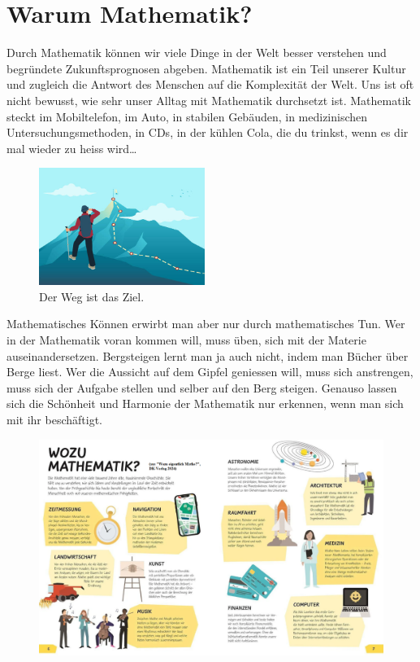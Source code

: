 \section{Warum Mathematik?}
Durch Mathematik können wir viele Dinge in der Welt besser verstehen und begründete Zukunftsprognosen abgeben. Mathematik ist ein Teil unserer Kultur und zugleich die Antwort des Menschen auf die Komplexität der Welt. Uns ist oft nicht bewusst, wie sehr unser Alltag mit Mathematik durchsetzt ist. Mathematik steckt im Mobiltelefon, im Auto, in stabilen Gebäuden, in medizinischen Untersuchungsmethoden, in CDs, in der kühlen Cola, die du trinkst, wenn es dir mal wieder zu heiss wird\ldots
\begin{figure}
	\begin{center}
		\includegraphics[width=0.48\textwidth]{Bergsteigen}
	\end{center}
	\caption{Der Weg ist das Ziel.}
\end{figure}
Mathematisches Können erwirbt man aber nur durch mathematisches Tun. Wer in der Mathematik voran kommen will, muss üben, sich mit der Materie auseinandersetzen. Bergsteigen lernt man ja auch nicht, indem man Bücher über Berge liest. Wer die Aussicht auf dem Gipfel geniessen will, muss sich anstrengen, muss sich der Aufgabe stellen und selber auf den Berg steigen. Genauso lassen sich die Schönheit und Harmonie der Mathematik nur erkennen, wenn man sich mit ihr beschäftigt.


\begin{figure}
\includegraphics[angle=90,scale=0.65]{WozuMathematik}
\end{figure}
\thispagestyle{empty}
